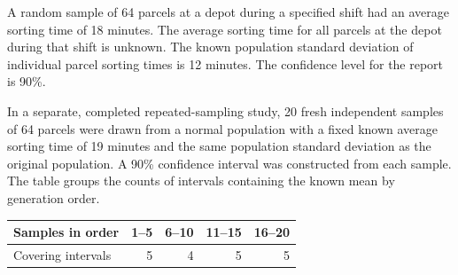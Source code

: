 \noindent\begin{minipage}[t]{0.60\linewidth}
\vspace{0pt}
A random sample of 64 parcels at a depot during a specified shift had an average sorting time of 18 minutes. The average sorting time for all parcels at the depot during that shift is unknown. The known population standard deviation of individual parcel sorting times is 12 minutes. The confidence level for the report is 90\%.

In a separate, completed repeated-sampling study, 20 fresh independent samples of 64 parcels were drawn from a normal population with a fixed known average sorting time of 19 minutes and the same population standard deviation as the original population. A 90\% confidence interval was constructed from each sample. The table groups the counts of intervals containing the known mean by generation order.
\end{minipage}\hfill
\begin{minipage}[t]{0.38\linewidth}
\vspace{0pt}
\centering
\small
\setlength{\tabcolsep}{4pt}
\begin{tabularx}{\linewidth}{@{}>{\raggedright\arraybackslash}Xrrrr@{}}\toprule
Samples in order & 1--5 & 6--10 & 11--15 & 16--20\\\midrule
Covering intervals & 5 & 4 & 5 & 5\\
\bottomrule\end{tabularx}
\end{minipage}\par

